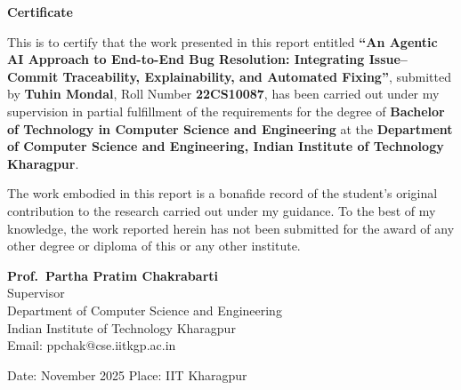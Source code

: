 \begin{center}
    {\Large\textbf{Certificate}}\\[0.4in]
\end{center}

This is to certify that the work presented in this report entitled \textbf{``An Agentic AI Approach to End-to-End Bug Resolution: Integrating Issue–Commit Traceability, Explainability, and Automated Fixing''}, submitted by \textbf{Tuhin Mondal}, Roll Number \textbf{22CS10087}, has been carried out under my supervision in partial fulfillment of the requirements for the degree of \textbf{Bachelor of Technology in Computer Science and Engineering} at the \textbf{Department of Computer Science and Engineering, Indian Institute of Technology Kharagpur}.\\

\vspace{0.1in}

The work embodied in this report is a bonafide record of the student’s original contribution to the research carried out under my guidance. To the best of my knowledge, the work reported herein has not been submitted for the award of any other degree or diploma of this or any other institute.

\vspace{4in}

\begin{flushright}
\textbf{Prof.\ Partha Pratim Chakrabarti}\\
Supervisor\\
Department of Computer Science and Engineering\\
Indian Institute of Technology Kharagpur\\
Email: ppchak@cse.iitkgp.ac.in
\end{flushright}

\vspace{0.8in}
\noindent
Date: November 2025 \hfill Place: IIT Kharagpur

\newpage
